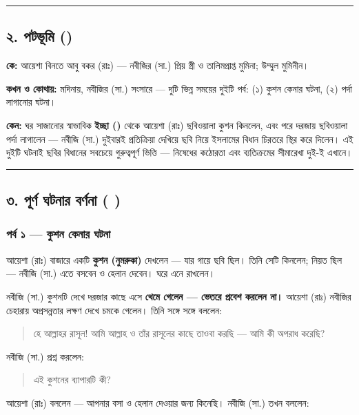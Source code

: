 \medskip\hrule\medskip

\subsection*{২. পটভূমি ()}

\textbf{কে:} আয়েশা বিনতে আবু বকর (রাঃ) — নবীজির (সা.) প্রিয় স্ত্রী ও তালিমপ্রাপ্ত মুমিনা; উম্মুল মুমিনীন।

\textbf{কখন ও কোথায়:} মদিনায়, নবীজির (সা.) সংসারে — দুটি ভিন্ন সময়ের দুইটি পর্ব: (১) কুশন কেনার ঘটনা, (২) পর্দা লাগানোর ঘটনা।

\textbf{কেন:} ঘর সাজানোর স্বাভাবিক \textbf{ইচ্ছা ()} থেকে আয়েশা (রাঃ) ছবিওয়ালা কুশন কিনলেন, এবং পরে দরজায় ছবিওয়ালা পর্দা লাগালেন — নবীজি (সা.) দুইবারই প্রতিক্রিয়া দেখিয়ে ছবি নিয়ে ইসলামের বিধান চিরতরে স্থির করে দিলেন। এই দুইটি ঘটনাই ছবির বিধানের সবচেয়ে গুরুত্বপূর্ণ ভিত্তি — নিষেধের কঠোরতা এবং ব্যতিক্রমের সীমারেখা দুই-ই এখানে।

\medskip\hrule\medskip

\subsection*{৩. পূর্ণ ঘটনার বর্ণনা (  )}

\subsubsection*{পর্ব ১ — কুশন কেনার ঘটনা}

আয়েশা (রাঃ) বাজারে একটি \textbf{কুশন (নুমরুকা)} দেখলেন — যার গায়ে ছবি ছিল। তিনি সেটি কিনলেন; নিয়ত ছিল — নবীজি (সা.) এতে বসবেন ও হেলান দেবেন। ঘরে এনে রাখলেন।

নবীজি (সা.) কুশনটি দেখে দরজার কাছে এসে \textbf{থেমে গেলেন — ভেতরে প্রবেশ করলেন না।} আয়েশা (রাঃ) নবীজির চেহারায় অপ্রসন্নতার লক্ষণ দেখে চমকে গেলেন। তিনি সঙ্গে সঙ্গে বললেন:

\begin{quote}
হে আল্লাহর রাসূল! আমি আল্লাহ ও তাঁর রাসূলের কাছে তাওবা করছি — আমি কী অপরাধ করেছি?
\end{quote}

নবীজি (সা.) প্রশ্ন করলেন:

\begin{quote}
এই কুশনের ব্যাপারটি কী?
\end{quote}

আয়েশা (রাঃ) বললেন — আপনার বসা ও হেলান দেওয়ার জন্য কিনেছি। নবীজি (সা.) তখন বললেন:

